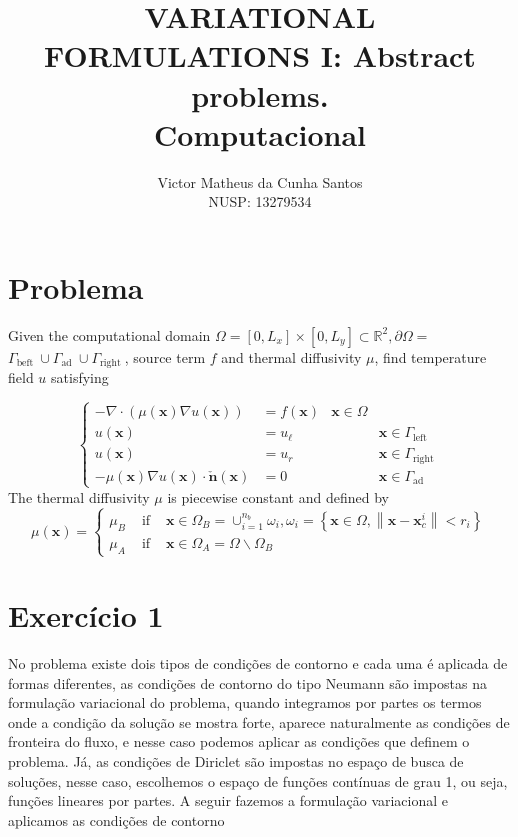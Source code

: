 \documentclass{article}
\title{VARIATIONAL FORMULATIONS I: Abstract problems.\\
	Computacional}
\author{Victor Matheus da Cunha Santos\\
	NUSP: 13279534}
\begin{document}
	\maketitle
	\pagecolor{cremeSepia}
	
\section*{Problema}	
Given the computational domain $\Omega=\left[0, L_x\right] \times\left[0, L_y\right] \subset \mathbb{R}^2, \partial \Omega=$ $\Gamma_{\text {beft }} \cup \Gamma_{\text {ad }} \cup \Gamma_{\text {right }}$, source term $f$ and thermal diffusivity $\mu$, find temperature field $u$ satisfying

$$
\left\{\begin{array}{rlrl}
	-\nabla \cdot(\mu(\mathbf{x}) \nabla u(\mathbf{x})) & =f(\mathbf{x}) & \mathbf{x} \in \Omega \\
	u(\mathbf{x}) & =u_{\ell} & & \mathbf{x} \in \Gamma_{\text {left }} \\
	u(\mathbf{x}) & =u_r & & \mathbf{x} \in \Gamma_{\text {right }} \\
	-\mu(\mathbf{x}) \nabla u(\mathbf{x}) \cdot \check{\mathbf{n}}(\mathbf{x}) & =0 & & \mathbf{x} \in \Gamma_{\text {ad }}
\end{array}\right.
$$
The thermal diffusivity $\mu$ is piecewise constant and defined by
$$
\mu(\mathbf{x})=\left\{\begin{array}{lll}
	\mu_B & \text { if } & \mathbf{x} \in \Omega_B=\cup_{i=1}^{n_b} \omega_i, \omega_i=\left\{\mathbf{x} \in \Omega,\left\|\mathbf{x}-\mathbf{x}_c^i\right\|<r_i\right\} \\
	\mu_A & \text { if } & \mathbf{x} \in \Omega_A=\Omega \backslash \Omega_B
\end{array}\right.
$$	
	
	
\section{Exercício 1}
	No problema existe dois tipos de condições de contorno e cada uma é aplicada de formas diferentes, as condições de contorno do tipo Neumann são impostas na formulação variacional do problema, quando integramos por partes os termos onde a condição da solução se mostra forte, aparece naturalmente as condições de fronteira do fluxo, e nesse caso podemos aplicar as condições que definem o problema. Já, as condições de Diriclet são impostas no espaço de busca de soluções, nesse caso, escolhemos o espaço de funções contínuas de grau 1, ou seja, funções lineares por partes. A seguir fazemos a formulação variacional e aplicamos as condições de contorno
\end{document}
